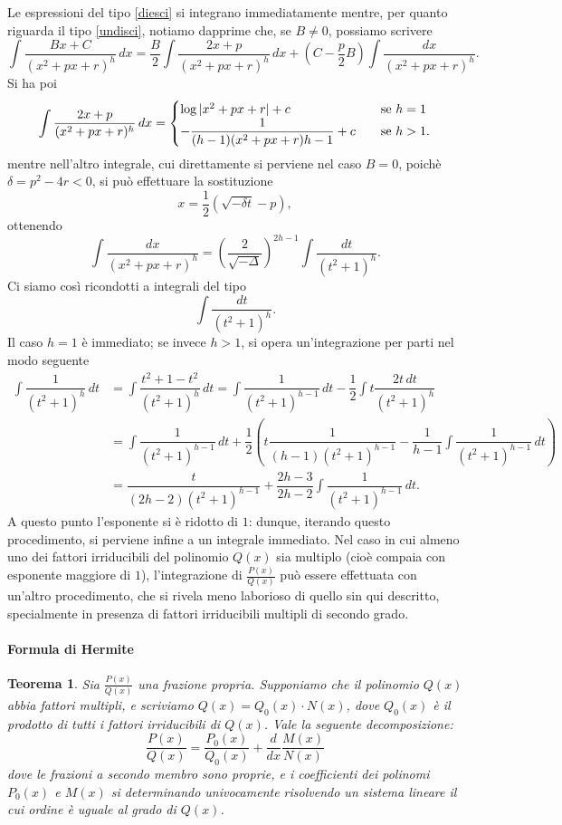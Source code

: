\documentclass{article}
\theoremstyle{plain}
\newtheorem{thm}{Teorema}[section]
\theoremstyle{definition}
\theoremstyle{remark}
\begin{document}
Le espressioni del tipo \ref{diesci} si integrano immediatamente mentre, per quanto riguarda il tipo \ref{undisci}, notiamo dapprime che, se $B\neq0$, possiamo scrivere
\[\int\dfrac{Bx+C}{(x^2+px+r)^h}\,dx=\dfrac{B}{2}\int\dfrac{2x+p}{(x^2+px+r)^h}\,dx+\left(C-\dfrac{p}{2}B\right)\int\dfrac{dx}{(x^2+px+r)^h}.\]
Si ha poi 
\[\int\dfrac{2x+p}{(x^2+px+r)^h}\,dx=\begin{cases}
    \log|x^2+px+r|+c&\quad\textup{se } h=1\\
        -\dfrac{1}{(h-1)(x^2+px+r){h-1}}+c&\quad\textup{se } h>1.
\end{cases}\]
mentre nell'altro integrale, cui direttamente si perviene nel caso $B=0$, poichè $\delta=p^2-4r<0$, si può effettuare la sostituzione \[x=\dfrac{1}{2}(\sqrt{-\delta t}-p),\] ottenendo
\[\int\dfrac{dx}{(x^2+px+r)^h}=\left(\dfrac{2}{\sqrt{-\Delta}}\right)^{2h-1}\int\dfrac{dt}{(t^2+1)^h}.\]
Ci siamo così ricondotti a integrali del tipo \[\int\dfrac{dt}{(t^2+1)^h}.\]
Il caso $h=1$ è immediato; se invece $h>1$, si opera un'integrazione per parti nel modo seguente
\begin{align*}
    \int\dfrac{1}{(t^2+1)^h}\,dt&=\int\dfrac{t^2+1-t^2}{(t^2+1)^h}\,dt=\int\dfrac{1}{(t^2+1)^{h-1}}\,dt-\dfrac{1}{2}\int t\dfrac{2t\,dt}{(t^2+1)^h}\\
    &=\int\dfrac{1}{(t^2+1)^{h-1}}\,dt+\dfrac{1}{2}\left(t\dfrac{1}{(h-1)(t^2+1)^{h-1}}-\dfrac{1}{h-1}\int\dfrac{1}{(t^2+1)^{h-1}}\,dt\right)\\
    &=\dfrac{t}{(2h-2)(t^2+1)^{h-1}}+\dfrac{2h-3}{2h-2}\int\dfrac{1}{(t^2+1)^{h-1}}\,dt.
\end{align*}
A questo punto l'esponente si è ridotto di $1$: dunque, iterando questo procedimento, si perviene infine a un integrale immediato.
Nel caso in cui almeno uno dei fattori irriducibili del polinomio $Q(x)$ sia multiplo (cioè compaia con esponente maggiore di $1$), l'integrazione di $\frac{P(x)}{Q(x)}$ può essere effettuata con un'altro procedimento, che si rivela meno laborioso 
di quello sin qui descritto, specialmente in presenza di fattori irriducibili multipli di secondo grado.

\vspace{10pt}

\paragraph{Formula di Hermite}
\begin{bxthm}
\begin{thm}
    Sia $\frac{P(x)}{Q(x)}$ una frazione propria. Supponiamo che il polinomio $Q(x)$ abbia fattori multipli, e scriviamo $Q(x)=Q_0(x)\cdot N(x)$, dove $Q_0(x)$ è il prodotto di tutti i fattori irriducibili di $Q(x)$. 
    Vale la seguente decomposizione:
    \begin{equation}
        \dfrac{P(x)}{Q(x)}=\dfrac{P_0(x)}{Q_0(x)}+\dfrac{d}{dx}\dfrac{M(x)}{N(x)}\label{dodici}
    \end{equation}
    dove le frazioni a secondo membro sono proprie, e i coefficienti dei polinomi $P_0(x)$ e $M(x)$ si determinando univocamente risolvendo un sistema lineare 
    il cui ordine è uguale al grado di $Q(x)$.
\end{thm}
\end{bxthm}
\end{document}
